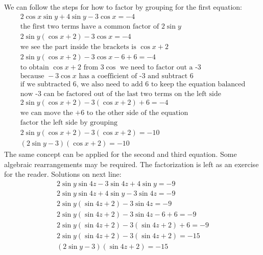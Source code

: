\documentclass[a4paper,12pt]{article}
\begin{document}
We can follow the steps for how to factor by grouping for the first equation:
\begin{equation}
    \begin{split}
        2\cos x\sin y+ 4\sin y-3\cos x = -4\\
        \text{the first two terms have a common factor of } 2\sin y \\
        2\sin y(\cos x+2) - 3\cos x = -4\\
        \text{we see the part inside the brackets is } \cos x+2 \\
        2\sin y(\cos x+2) - 3\cos x-6+6= -4\\
        \text{to obtain }\cos x+2\text{ from }3\cos\text{ we need to factor out a -3} \\
        \text{because } -3\cos x \text{ has a coefficient of -3 and subtract 6} \\
        \text{if we subtracted 6, we also need to add 6 to keep the equation balanced} \\
        \text{now -3 can be factored out of the last two terms on the left side} \\
        2\sin y(\cos x+2) - 3(\cos x+2) + 6= -4\\
        \text{we can move the +6 to the other side of the equation} \\
        \text{factor the left side by grouping} \\
        2\sin y(\cos x+2) - 3(\cos x+2)= -10\\
        (2\sin y-3)(\cos x+2)= -10
    \end{split}
\end{equation}
The same concept can be applied for the second and third equation. Some algebraic rearrangements may be required. The factorization is left as an exercise for the reader. Solutions on next line:
\begin{equation}
    \begin{split}
        2\sin y\sin 4z-3\sin 4z+4\sin y=-9 \\
        2\sin y\sin 4z+4\sin y-3\sin 4z=-9 \\
        2\sin y(\sin 4z+2)-3\sin 4z=-9 \\
        2\sin y(\sin 4z+2)-3\sin 4z-6+6=-9 \\
        2\sin y(\sin 4z+2)-3(\sin 4z+2)+6=-9 \\
        2\sin y(\sin 4z+2)-3(\sin 4z+2)=-15 \\
        (2\sin y-3)(\sin 4z+2)=-15
    \end{split}
\end{equation}
\end{document}
